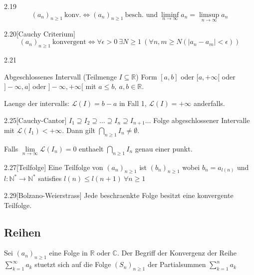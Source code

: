 \documentclass[8pt,a4paper,twocolumn,table]{extarticle}
\newcommand{\N}{\mathbb{N}}
\newcommand{\R}{\mathbb{R}}
\newcommand{\seq}[1]{\left( #1_n \right)_{n \ge 1}}
\begin{document}
\begin{lemma}{2.19}
    \[
        \seq{a}\ \mbox{konv.} \iff \seq{a}\ \mbox{besch. und}\ \liminf_{n \to \infty} a_n = \limsup_{n \to \infty} a_n
    \]
\end{lemma}

\begin{satz}{2.20}[Cauchy Criterium]
    \label{satz:cauchy-criterium-folge}
    \[ \seq{a}\ \mbox{konvergent} \iff \forall \epsilon > 0\
        \exists N \ge 1\ \left( \forall n,m \ge N \left( \lvert a_n - a_m \rvert < \epsilon \right) \right) \]
\end{satz}

\begin{definition}{2.21}
    \par Abgeschlossenes Intervall (Teilmenge $I \subseteq \R$)
    Form $[a,b]$ oder $[a, +\infty[$ oder $]-\infty, a]$ oder $]-\infty, +\infty[$ mit $a \le b,\ a,b \in \R$.

    Laenge der intervalls: $\mathcal{L}(I) = b - a$ in Fall 1, $\mathcal{L}(I) = +\infty$ anderfalls.
\end{definition}

\begin{satz}{2.25}[Cauchy-Cantor]
    \label{satz:cauchy-cantor}
    $I_1 \supseteq I_2 \supseteq \dots \supseteq I_n \supseteq I_{n + 1} \dots$ Folge abgeschlossener Intervalle mit $\mathcal{L}(I_1) < +\infty$.
    Dann gilt $\bigcap_{n \ge 1} I_n \ne \emptyset$.

    Falls $\underset{n \to \infty}{\lim} \mathcal{L}(I_n) = 0$ enthaelt $\bigcap_{n \ge 1} I_n$ genau einer punkt.
\end{satz}

\begin{definition}{2.27}[Teilfolge]
    Eine Teilfolge von $\seq{a}$ ist $\seq{b}$ wobei $b_n = a_{l(n)}$ und $l: \N^* \to \N^*$ satisfies $l(n) \le l(n + 1)\ \forall n \ge 1$
\end{definition}

\begin{satz}{2.29}[Bolzano-Weierstrass]
    \label{satz:bolzano-weierstrass}
    Jede beschraenkte Folge besitzt eine konvergente Teilfolge.
\end{satz}

\subsection{Reihen}
Sei $\seq{a}$ eine Folge in $\R$ oder $\mathbb{C}$. Der Begriff der Konvergenz der Reihe $\sum_{k = 1}^{\infty} a_k$ stuetzt sich auf die
Folge $\seq{S}$ der Partialsummen $\sum_{k = 1}^n a_k$
\end{document}
